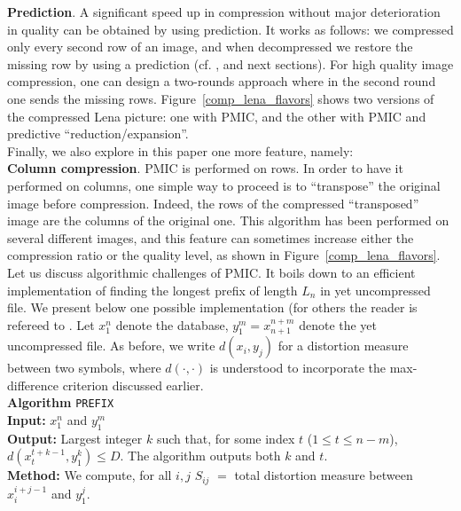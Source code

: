 \documentclass[11pt,a4paper]{article}
\begin{document}
{\bf Prediction}. A significant speed up in compression without major
deterioration in quality can be obtained by using prediction. It works as
follows: we compressed only every second row of an image, and when
decompressed we restore the missing row by using a prediction (cf.
\cite{rj}, and next sections).  For high quality image compression, one can
design a two-rounds approach where in the second round one sends the
missing rows.  Figure~\ref{comp_lena_flavors} shows two versions of the
compressed Lena picture: one with PMIC, and the other with PMIC and
predictive ``reduction/expansion''.\\

Finally, we also explore in this paper one more feature, namely:\\

{\bf Column compression}. PMIC is performed on rows. 
In order to have it performed on columns,
one simple way to proceed is to ``transpose'' the original image before
compression. Indeed, the rows of the compressed ``transposed''
image are the columns of the original one. This algorithm has been
performed on several different images, and this feature can sometimes
increase either the compression ratio or the quality level, as shown in
Figure~\ref{comp_lena_flavors}.\\

Let us discuss algorithmic challenges of PMIC. It boils down to
an efficient implementation of finding the longest prefix of length $L_n$
in yet uncompressed file. 
We present below one possible implementation (for others the
reader is refereed to \cite{ags}.
Let $x_1^n$ denote the database, $y_1^m=x_{n+1}^{n+m}$ denote the
yet uncompressed file.
As before, we write $d(x_i,y_j)$ for a distortion measure between two
symbols, where $d( \cdot , \cdot )$ is understood to incorporate
the max-difference criterion discussed earlier.\\

{\bf Algorithm} {\tt PREFIX}\\
{\bf Input:} $x_1^n$ and $y_1^m$\\
{\bf Output:} Largest integer $k$ such that, for some index $t$ ($1
\leq t \leq n-m$),
$d ( x_t^{t+k-1} , y_1^k ) \leq D$.  The algorithm outputs both $k$
and $t$.\\
{\bf Method:} We compute, for all $i,j$ $S_{ij}$ $=$ total distortion
measure between $x_i^{i+j-1}$ and $y_1^j$.\\
\end{document}
